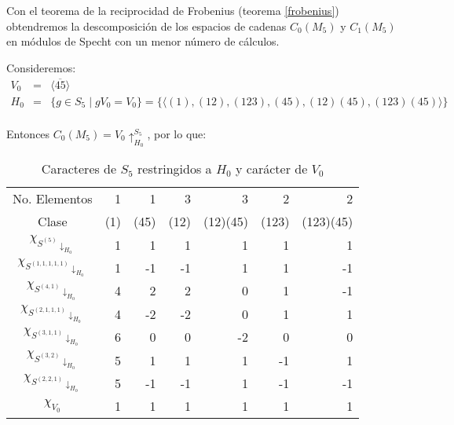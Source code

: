 \documentclass[12pt]{book}
\theoremstyle{definition}
\newcounter{in}
\begin{document}
Con el teorema de la reciprocidad de Frobenius (teorema
\ref{frobenius}) obtendremos la descomposición de los espacios de
cadenas $C_{0}(M_{5})$ y $C_{1}(M_{5})$ en módulos de Specht con un
menor número de cálculos. 

Consideremos:
\begin{eqnarray*}
  V_{0}&=&\langle\overline{45}\rangle\\
  H_{0}&=&\{g\in S_{5}\mid gV_{0}=V_{0}\}=\{\langle(1),(12),(123),(45),(12)(45),(123)(45)\rangle\}\\
\end{eqnarray*}

Entonces $C_{0}(M_{5})=V_{0}\uparrow^{S_{5}}_{H_0}$, por lo que:

\begin{table}[!hbtp]
  \centering
    \begin{tabular}{c |r r r r r r}
      No. Elementos& 1 & 1 & 3 & 3 & 2 & 2 \\
      Clase & (1) & (45) & (12) & (12)(45) & (123) & (123)(45) \\
      \hline
      $\chi_{S^{(5)}\downarrow_{H_{0}}}$       & 1 & 1 & 1 & 1 & 1 & 1 \\
      $\chi_{S^{(1,1,1,1,1)}\downarrow_{H_{0}}}$ & 1 & -1 & -1 & 1 & 1 & -1 \\
      $\chi_{S^{(4,1)}\downarrow_{H_{0}}}$      & 4 & 2 & 2 & 0 & 1 & -1 \\
      $\chi_{S^{(2,1,1,1)}\downarrow_{H_{0}}}$   & 4 & -2 & -2 & 0 & 1 & 1 \\
      $\chi_{S^{(3,1,1)}\downarrow_{H_{0}}}$     & 6 & 0 & 0 & -2 & 0 & 0 \\
      $\chi_{S^{(3,2)}\downarrow_{H_{0}}}$      & 5 & 1 & 1 & 1 & -1 & 1 \\
      $\chi_{S^{(2,2,1)}\downarrow_{H_{0}}}$    & 5 & -1 & -1 & 1 & -1 & -1 \\
      \hline
      $\chi_{V_{0}}$ & 1 & 1 & 1 & 1 & 1 & 1 \\
    \end{tabular}

\caption{Caracteres de $S_{5}$ restringidos a $H_{0}$ y carácter de $V_{0}$}
\label{tab:restriccion-H_0}
\end{table}
\end{document}
